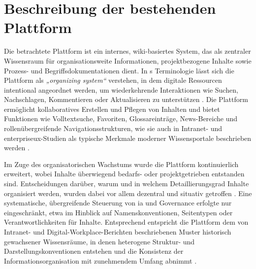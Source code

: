 \section{Beschreibung der bestehenden Plattform}
\label{sec:03-02_platform-description}

Die betrachtete Plattform ist ein internes, wiki-basiertes System, das als zentraler Wissensraum für organisationsweite Informationen, projektbezogene Inhalte sowie Prozess- und Begriffsdokumentationen dient. In \citeauthor{419:Glushko2013}s Terminologie lässt sich die Plattform als \textit{„organizing system“} verstehen, in dem digitale Ressourcen intentional angeordnet werden, um wiederkehrende Interaktionen wie Suchen, Nachschlagen, Kommentieren oder Aktualisieren zu unterstützen \cite{419:Glushko2013}. Die Plattform ermöglicht kollaboratives Erstellen und Pflegen von Inhalten und bietet Funktionen wie Volltextsuche, Favoriten, Glossareinträge, News-Bereiche und rollenübergreifende Navigationsstrukturen, wie sie auch in Intranet- und \Gls{enterpriseux}-Studien als typische Merkmale moderner Wissensportale beschrieben werden \cite{113:NNGIntranetGuidelines}.

Im Zuge des organisatorischen Wachstums wurde die Plattform kontinuierlich erweitert, wobei Inhalte überwiegend bedarfs- oder projektgetrieben entstanden sind. Entscheidungen darüber, warum und in welchem Detaillierungsgrad Inhalte organisiert werden, wurden dabei vor allem dezentral und situativ getroffen \cite{419:Glushko2013}. Eine systematische, übergreifende Steuerung von \Gls{ia} und Governance erfolgte nur eingeschränkt, etwa im Hinblick auf Namenskonventionen, Seitentypen oder Verantwortlichkeiten für Inhalte. Entsprechend entspricht die Plattform dem von Intranet- und Digital-Workplace-Berichten beschriebenen Muster historisch gewachsener Wissensräume, in denen heterogene Struktur- und Darstellungskonventionen entstehen und die Konsistenz der Informationsorganisation mit zunehmendem Umfang abnimmt \cite{113:NNGIntranetGuidelines}.
